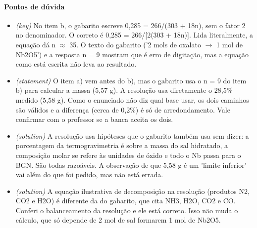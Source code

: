\documentclass{article}%
\begin{document}
\paragraph{Pontos de dúvida}%
\begin{itemize}%
\item%
\textit{(key)} No item b, o gabarito escreve 0,285 = 266/(303 + 18n), sem o fator 2 no denominador. O correto é 0,285 = 266/{[}2(303 + 18n){]}. Lida literalmente, a equação dá n $\approx$ 35. O texto do gabarito ('2 mols de oxalato $\to$ 1 mol de Nb2O5') e a resposta n = 9 mostram que é erro de digitação, mas a equação como está escrita não leva ao resultado.%
\item%
\textit{(statement)} O item a) vem antes do b), mas o gabarito usa o n = 9 do item b) para calcular a massa (5,57 g). A resolução usa diretamente o 28,5\% medido (5,58 g). Como o enunciado não diz qual base usar, os dois caminhos são válidos e a diferença (cerca de 0,2\%) é só de arredondamento. Vale confirmar com o professor se a banca aceita os dois.%
\item%
\textit{(solution)} A resolução usa hipóteses que o gabarito também usa sem dizer: a porcentagem da termogravimetria é sobre a massa do sal hidratado, a composição molar se refere às unidades de óxido e todo o Nb passa para o BGN. São todas razoáveis. A observação de que 5,58 g é um 'limite inferior' vai além do que foi pedido, mas não está errada.%
\item%
\textit{(solution)} A equação ilustrativa de decomposição na resolução (produtos N2, CO2 e H2O) é diferente da do gabarito, que cita NH3, H2O, CO2 e CO. Conferi o balanceamento da resolução e ele está correto. Isso não muda o cálculo, que só depende de 2 mol de sal formarem 1 mol de Nb2O5.%
\end{itemize}%
\end{document}
